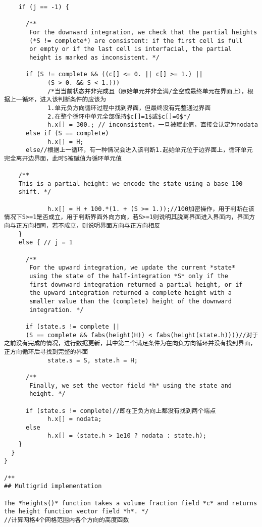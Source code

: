 \documentclass[lang=cn,11pt,a4paper]{elegantpaper}
\begin{document}
\begin{verbatim}
    if (j == -1) {

      /**
       For the downward integration, we check that the partial heights
       (*S != complete*) are consistent: if the first cell is full
       or empty or if the last cell is interfacial, the partial
       height is marked as inconsistent. */
      
      if (S != complete && ((c[] <= 0. || c[] >= 1.) ||
            (S > 0. && S < 1.)))
            /*当当前状态并非完成且（原始单元并非全满/全空或最终单元在界面上），根据上一循环，进入该判断条件的应该为
            1.单元负方向循环过程中找到界面，但最终没有完整通过界面
            2.在整个循环中单元全部保持$c[]=1$或$c[]=0$*/
            h.x[] = 300.; // inconsistent，一旦被赋此值，直接会认定为nodata
      else if (S == complete)
            h.x[] = H;
      else//根据上一循环，有一种情况会进入该判断1.起始单元位于边界面上，循环单元完全离开边界面，此时S被赋值为循环单元值

    /**
    This is a partial height: we encode the state using a base 100
    shift. */
    
            h.x[] = H + 100.*(1. + (S >= 1.));//100加密操作，用于判断在该情况下S>=1是否成立，用于判断界面外向方向，若S>=1则说明其脱离界面进入界面内，界面方向与正方向相同，若不成立，则说明界面方向与正方向相反
    }
    else { // j = 1

      /**
       For the upward integration, we update the current *state*
       using the state of the half-integration *S* only if the
       first downward integration returned a partial height, or if
       the upward integration returned a complete height with a
       smaller value than the (complete) height of the downward
       integration. */
      
      if (state.s != complete ||
      (S == complete && fabs(height(H)) < fabs(height(state.h))))//对于之前没有完成的情况，进行数据更新，其中第二个满足条件为在向负方向循环并没有找到界面，正方向循环后寻找到完整的界面
            state.s = S, state.h = H;
      
      /**
       Finally, we set the vector field *h* using the state and
       height. */
      
      if (state.s != complete)//即在正负方向上都没有找到两个端点
            h.x[] = nodata;
      else
            h.x[] = (state.h > 1e10 ? nodata : state.h);
    }
  }
}

/**
## Multigrid implementation

The *heights()* function takes a volume fraction field *c* and returns
the height function vector field *h*. */
//计算网格4个网格范围内各个方向的高度函数


\end{verbatim}
\end{document}
